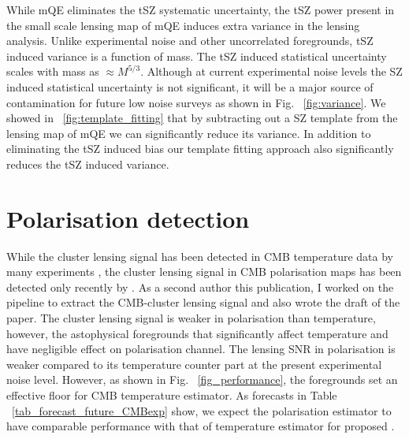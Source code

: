  While mQE eliminates the tSZ systematic uncertainty, the tSZ power present in the small scale lensing map of mQE induces extra variance in the lensing analysis. 
 Unlike experimental noise and other uncorrelated foregrounds, tSZ induced variance is a function of mass. 
The tSZ induced statistical uncertainty scales with mass as $\approx M^{5/3}$. 
 Although at current experimental noise levels the SZ induced statistical uncertainty is not significant, it will be a major source of contamination for future low noise surveys as shown in Fig. ~\ref{fig:variance}. We showed in ~\ref{fig:template_fitting} that by subtracting out a SZ template from the lensing map of mQE we can significantly reduce its variance. In addition to eliminating the tSZ induced bias our template fitting approach also significantly reduces the tSZ induced variance. 

 \section{Polarisation detection}
 \label{pol_detection}
 While the cluster lensing signal has been detected in CMB temperature data by many experiments \citep{baxter15, raghunathan18,geach17, baxter18}, the cluster lensing signal in CMB polarisation maps has been detected only recently by \citet{raghunathan19}. As a second author this publication, I worked on the pipeline to extract the CMB-cluster lensing signal and also wrote the draft of the paper.   
 The cluster lensing signal is weaker in polarisation than temperature, however, the astophysical foregrounds that significantly affect temperature and have negligible effect on polarisation channel.
  The lensing SNR in polarisation is weaker compared to its temperature counter part at the present experimental noise level. However, as shown in Fig. ~\ref{fig_performance}, the foregrounds set an effective floor for CMB temperature estimator. %
  As forecasts in Table ~\ref{tab_forecast_future_CMBexp} show, we expect the polarisation estimator to have comparable performance with that of temperature estimator for proposed \citet{cmbs4-sb1}.
 
